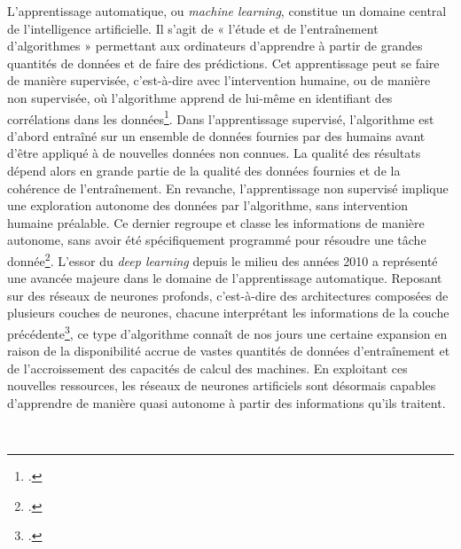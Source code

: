 L’apprentissage automatique, ou \textit{machine learning}, constitue un domaine central de l’intelligence artificielle. Il s’agit de « l’étude et de l’entraînement d’algorithmes » permettant aux ordinateurs d’apprendre à partir de grandes quantités de données et de faire des prédictions. Cet apprentissage peut se faire de manière supervisée, c’est-à-dire avec l’intervention humaine, ou de manière non supervisée, où l’algorithme apprend de lui-même en identifiant des corrélations dans les données\footcite{puren_intelligence_2020}.
Dans l’apprentissage supervisé, l’algorithme est d’abord entraîné sur un ensemble de données fournies par des humains avant d’être appliqué à de nouvelles données non connues. La qualité des résultats dépend alors en grande partie de la qualité des données fournies et de la cohérence de l’entraînement. En revanche, l’apprentissage non supervisé implique une exploration autonome des données par l’algorithme, sans intervention humaine préalable. Ce dernier regroupe et classe les informations de manière autonome, sans avoir été spécifiquement programmé pour résoudre une tâche donnée\footcite{puren_intelligence_2020}.
L’essor du \textit{deep learning} depuis le milieu des années 2010 a représenté une avancée majeure dans le domaine de l’apprentissage automatique. Reposant sur des réseaux de neurones profonds, c’est-à-dire des architectures composées de plusieurs couches de neurones, chacune interprétant les informations de la couche précédente\footcite{puren_intelligence_2020}, ce type d’algorithme connaît de nos jours une certaine expansion en raison de la disponibilité accrue de vastes quantités de données d’entraînement et de l’accroissement des capacités de calcul des machines. En exploitant ces nouvelles ressources, les réseaux de neurones artificiels sont désormais capables d’apprendre de manière quasi autonome à partir des informations qu’ils traitent. 

\\

